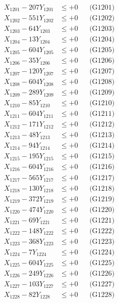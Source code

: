 \documentclass[a4paper,10pt]{article}
\begin{document}
{\begin{align}
\allowbreak
X_{1201} - 207Y_{1201} &\leq +0 && \text{(G1201)} \\
X_{1202} - 551Y_{1202} &\leq +0 && \text{(G1202)} \\
X_{1203} - 64Y_{1203} &\leq +0 && \text{(G1203)} \\
X_{1204} - 13Y_{1204} &\leq +0 && \text{(G1204)} \\
X_{1205} - 604Y_{1205} &\leq +0 && \text{(G1205)} \\
X_{1206} - 35Y_{1206} &\leq +0 && \text{(G1206)} \\
X_{1207} - 120Y_{1207} &\leq +0 && \text{(G1207)} \\
X_{1208} - 604Y_{1208} &\leq +0 && \text{(G1208)} \\
X_{1209} - 289Y_{1209} &\leq +0 && \text{(G1209)} \\
X_{1210} - 85Y_{1210} &\leq +0 && \text{(G1210)} \\
\allowbreak
X_{1211} - 604Y_{1211} &\leq +0 && \text{(G1211)} \\
X_{1212} - 171Y_{1212} &\leq +0 && \text{(G1212)} \\
X_{1213} - 48Y_{1213} &\leq +0 && \text{(G1213)} \\
X_{1214} - 94Y_{1214} &\leq +0 && \text{(G1214)} \\
X_{1215} - 195Y_{1215} &\leq +0 && \text{(G1215)} \\
X_{1216} - 604Y_{1216} &\leq +0 && \text{(G1216)} \\
X_{1217} - 565Y_{1217} &\leq +0 && \text{(G1217)} \\
X_{1218} - 130Y_{1218} &\leq +0 && \text{(G1218)} \\
X_{1219} - 372Y_{1219} &\leq +0 && \text{(G1219)} \\
X_{1220} - 474Y_{1220} &\leq +0 && \text{(G1220)} \\
\allowbreak
X_{1221} - 69Y_{1221} &\leq +0 && \text{(G1221)} \\
X_{1222} - 148Y_{1222} &\leq +0 && \text{(G1222)} \\
X_{1223} - 368Y_{1223} &\leq +0 && \text{(G1223)} \\
X_{1224} - 7Y_{1224} &\leq +0 && \text{(G1224)} \\
X_{1225} - 604Y_{1225} &\leq +0 && \text{(G1225)} \\
X_{1226} - 249Y_{1226} &\leq +0 && \text{(G1226)} \\
X_{1227} - 103Y_{1227} &\leq +0 && \text{(G1227)} \\
X_{1228} - 82Y_{1228} &\leq +0 && \text{(G1228)} \\

\end{align}}
\end{document}
